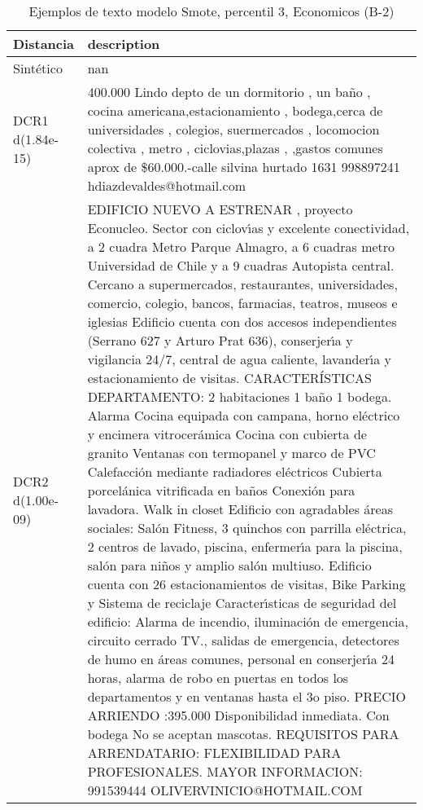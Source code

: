 \begin{table}[H]
\centering
\fontsize{10}{14}\selectfont
\caption{Ejemplos de texto modelo Smote, percentil 3, Economicos (B-2)}
\label{table-example-economicos-b-2-smote-enc-3p-text}
\begin{tabular}{|l|m{35em}|}
\hline
\rowcolor[gray]{0.8}
Distancia & description \\
\hline Sintético & nan \\
\hline DCR1 d(1.84e-15) & 400.000 Lindo depto de un dormitorio , un ba\~no , cocina americana,estacionamiento , bodega,cerca de universidades , colegios, suermercados , locomocion colectiva , metro , ciclovias,plazas , ,gastos comunes aprox de \$60.000.-calle silvina hurtado 1631 998897241 hdiazdevaldes@hotmail.com \\
\hline DCR2 d(1.00e-09) & EDIFICIO NUEVO A ESTRENAR , proyecto Econucleo. 
Sector con ciclov{\'\i}as y excelente conectividad, a 2 cuadra Metro Parque Almagro, a 6 cuadras metro Universidad de Chile y a 9 cuadras Autopista central. Cercano a supermercados, restaurantes, universidades, comercio, colegio, bancos, farmacias, teatros, museos e iglesias
Edificio cuenta con dos accesos independientes (Serrano 627 y Arturo Prat 636), conserjer{\'\i}a y vigilancia 24/7, central de agua caliente, lavander{\'\i}a y estacionamiento de visitas.
CARACTER\'ISTICAS DEPARTAMENTO:
2 habitaciones
1 ba\~no
1 bodega. 
Alarma
Cocina equipada con campana, horno el\'ectrico y encimera vitrocer\'amica
Cocina con cubierta de granito
Ventanas con termopanel y marco de PVC
Calefacci\'on mediante radiadores el\'ectricos
Cubierta porcel\'anica vitrificada en ba\~nos
Conexi\'on para lavadora.
Walk in closet
Edificio con agradables \'areas sociales: Sal\'on Fitness, 3 quinchos con parrilla el\'ectrica, 2 centros de lavado, piscina, enfermer{\'\i}a para la piscina, sal\'on para ni\~nos y amplio sal\'on multiuso.
Edificio cuenta con 26 estacionamientos de visitas, Bike Parking y Sistema de reciclaje
Caracter{\'\i}sticas de seguridad del edificio: Alarma de incendio, iluminaci\'on de emergencia, circuito cerrado TV., salidas de emergencia, detectores de humo en \'areas comunes, personal en conserjer{\'\i}a 24 horas, alarma de robo en puertas en todos los departamentos y en ventanas hasta el 3o piso.
PRECIO ARRIENDO :395.000
Disponibilidad inmediata.
Con bodega 
No se aceptan mascotas.
REQUISITOS PARA ARRENDATARIO:
FLEXIBILIDAD PARA PROFESIONALES.
MAYOR INFORMACION:
991539444
OLIVERVINICIO@HOTMAIL.COM \\
\hline
\end{tabular}
\end{table}
